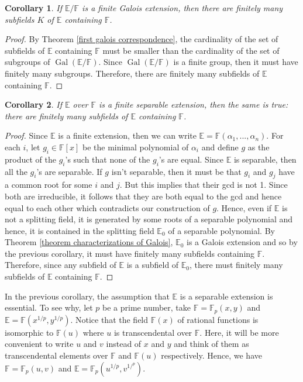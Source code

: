 \documentclass{article}
\theoremstyle{plain}
\newtheorem*{corollary}{Corollary}
\theoremstyle{definition}
\newcommand{\F}{\mathbb{F}}
\newcommand{\E}{\mathbb{E}}
\DeclareMathOperator{\Gal}{Gal}
\begin{document}
\begin{corollary}
    If $\E / \F$ is a finite Galois extension, then there are finitely many subfields $K$ of $\E$ containing $\F$.
\end{corollary}

\begin{proof}
    By Theorem \ref{first galois correspondence}, the cardinality of the set of subfields of $\E$ containing $\F$ must be smaller than the cardinality of the set of subgroups of $\Gal(\E / \F)$. Since $\Gal(\E / \F)$ is a finite group, then it must have finitely many subgroups. Therefore, there are finitely many subfields of $\E$ containing $\F$.
\end{proof}

\begin{corollary}
    If $\E$ over $\F$ is a finite separable extension, then the same is true: there are finitely many subfields of $\E$ containing $\F$.
\end{corollary}

\begin{proof}
    Since $\E$ is a finite extension, then we can write $\E = \F(\alpha_1, ..., \alpha_n)$. For each $i$, let $g_i \in \F[x]$ be the minimal polynomial of $\alpha_i$ and define $g$ as the product of the $g_i$'s such that none of the $g_i$'s are equal. Since $\E$ is separable, then all the $g_i$'s are separable. If $g$ isn't separable, then it must be that $g_i$ and $g_j$ have a common root for some $i$ and $j$. But this implies that their gcd is not 1. Since both are irreducible, it follows that they are both equal to the gcd and hence equal to each other which contradicts our construction of $g$. Hence, even if $\E$ is not a splitting field, it is generated by some roots of a separable polynomial and hence, it is contained in the splitting field $\E_0$ of a separable polynomial. By Theorem \ref{theorem characterizations of Galois}, $\E_0$ is a Galois extension and so by the previous corollary, it must have finitely many subfields containing $\F$. Therefore, since any subfield of $\E$ is a subfield of $\E_0$, there must finitely many subfields of $\E$ containing $\F$.
\end{proof}

In the previous corollary, the assumption that $\E$ is a separable extension is essential. To see why, let $p$ be a prime number, take $\F = \F_p(x,y)$ and $\E = \F(x^{1/p}, y^{1/p})$. Notice that the field $\F(x)$ of rational functions is isomorphic to $\F(u)$ where $u$ is transcendental over $\F$. Here, it will be more convenient to write $u$ and $v$ instead of $x$ and $y$ and think of them as transcendental elements over $\F$ and $\F(u)$ respectively. Hence, we have $\F = \F_p(u,v)$ and $\E = \F_p(u^{1/p}, v^{1/^p})$. 
\end{document}
